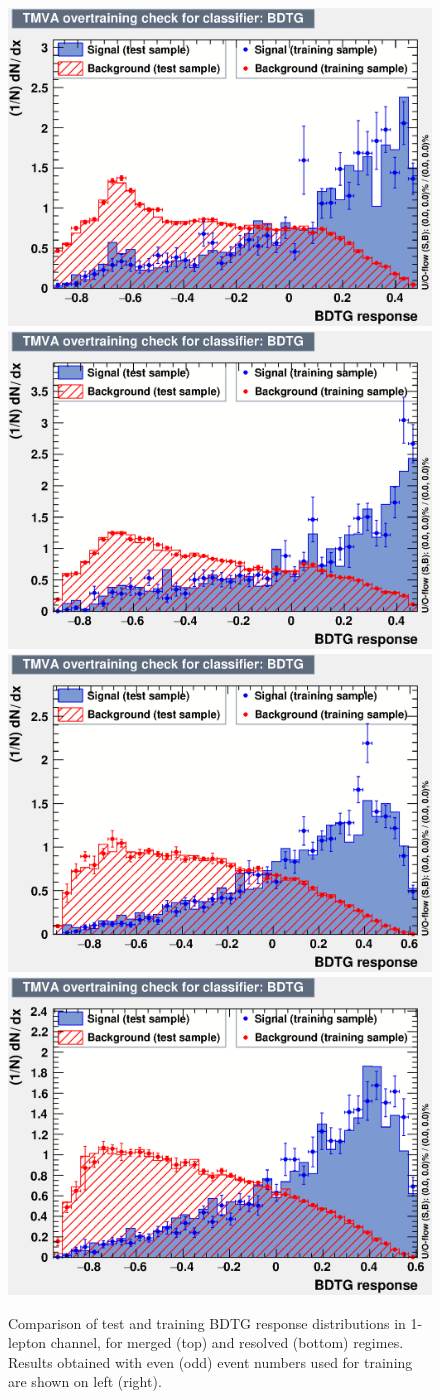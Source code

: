 \begin{figure}
	\begin{center}
		\includegraphics[width=0.4\linewidth]{Chapter5/overtrain_BDTG_merged.eps}
		\includegraphics[width=0.4\linewidth]{Chapter5/overtrain_BDTG_trainEven_merged.eps}\\
		\includegraphics[width=0.4\linewidth]{Chapter5/overtrain_BDTG_resolved.eps}
		\includegraphics[width=0.4\linewidth]{Chapter5/overtrain_BDTG_trainEven_resolved.eps}
	\end{center}
	\caption[]{
		Comparison of test and training BDTG response distributions in 1-lepton channel, for merged (top) and resolved (bottom) regimes.
		Results obtained with even (odd) event numbers used for training are shown on left (right).
	}    
	\label{fig:BDT1lep}
\end{figure}
